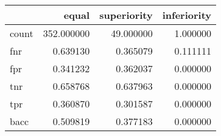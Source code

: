 \begin{tabular}{lrrr}
\toprule
{} &       equal &  superiority &  inferiority \\
\midrule
count &  352.000000 &    49.000000 &     1.000000 \\
fnr   &    0.639130 &     0.365079 &     0.111111 \\
fpr   &    0.341232 &     0.362037 &     0.000000 \\
tnr   &    0.658768 &     0.637963 &     0.000000 \\
tpr   &    0.360870 &     0.301587 &     0.000000 \\
bacc  &    0.509819 &     0.377183 &     0.000000 \\
\bottomrule
\end{tabular}
